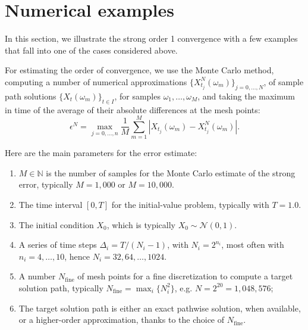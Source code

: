 \documentclass[reqno,12pt]{amsart}
\theoremstyle{plain}%
\theoremstyle{definition}
\begin{document}
\section{Numerical examples}

In this section, we illustrate the strong order 1 convergence with a few examples that fall into one of the cases considered above.

For estimating the order of convergence, we use the Monte Carlo method, computing a number of numerical approximations $\{X_{t_j}^N(\omega_m)\}_{j=0, \ldots, N}$, of sample path solutions $\{X_t(\omega_m)\}_{t\in I}$, for samples $\omega_1, \ldots, \omega_M$, and taking the maximum in time of the average of their absolute differences at the mesh points:
\begin{equation}
    \epsilon^N = \max_{j=0, \ldots, n} \frac{1}{M}\sum_{m=1}^M \left|X_{t_j}(\omega_m) - X_{t_j}^N(\omega_m)\right|.
\end{equation}

Here are the main parameters for the error estimate:
\begin{enumerate}
    \item $M\in\mathbb{N}$ is the number of samples for the Monte Carlo estimate of the strong error, typically $M=1,000$ or $M=10,000$.
    \item The time interval $[0, T]$ for the initial-value problem, typically with $T=1.0$.
    \item The initial condition $X_0$, which is typically $X_0 \sim \mathcal{N}(0, 1)$.
    \item A series of time steps $\Delta_i = T/(N_i-1)$, with $N_i=2^{n_i}$, most often with $n_i=4, \ldots, 10$, hence $N_i=32, 64, \ldots, 1024$.
    \item A number $N_{\mathrm{fine}}$ of mesh points for a fine discretization to compute a target solution path, typically $N_{\mathrm{fine}} = \max_i\{N_i^2\}$, e.g. $N=2^{20} = 1,048,576$;
    \item The target solution path is either an exact pathwise solution, when available, or a higher-order approximation, thanks to the choice of $N_{\mathrm{fine}}$.
\end{enumerate}
\end{document}
